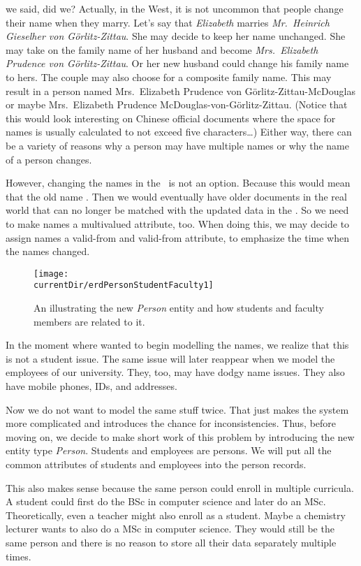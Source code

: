  we said, did we?
Actually, in the West, it is not uncommon that people change their name when they marry.
Let's say that \emph{Elizabeth} marries \emph{Mr.~Heinrich Gieselher von G{\"o}rlitz-Zittau}.
She may decide to keep her name unchanged.
She may take on the family name of her husband and become \emph{Mrs.~Elizabeth Prudence von G{\"o}rlitz-Zittau}.
Or her new husband could change his family name to hers.
The couple may also choose for a composite family name.
This may result in a person named Mrs.~Elizabeth Prudence von G{\"o}rlitz-Zittau-McDouglas or maybe Mrs.~Elizabeth Prudence McDouglas-von-G{\"o}rlitz-Zittau.
(Notice that this would look interesting on Chinese official documents where the space for names is usually calculated to not exceed five characters\dots)
Either way, there can be a variety of reasons why a person may have multiple names or why the name of a person changes.

However, changing the names in the \db\ is not an option.
Because this would mean that the old name .
Then we would eventually have older documents in the real world that can no longer be matched with the updated data in the \db.
So we need to make names a multivalued attribute, too.
When doing this, we may decide to assign names a valid-from and valid-from attribute, to emphasize the time when the names changed.

\begin{figure}%
\centering%
\texttt{[image: \\currentDir/erdPersonStudentFaculty1]}%
\caption{An  illustrating the new \emph{Person} entity and how students and faculty members are related to it.}%
\label{fig:erdPersonStudentFaculty1}%
\end{figure}%

In the moment where wanted to begin modelling the names, we realize that this is not a student issue.
The same issue will later reappear when we model the employees of our university.
They, too, may have dodgy name issues.
They also have mobile phones, IDs, and addresses.

Now we do not want to model the same stuff twice.
That just makes the system more complicated and introduces the chance for inconsistencies.
Thus, before moving on, we decide to make short work of this problem by introducing the new entity type \emph{Person}.
Students and employees are persons.
We will put all the common attributes of students and employees into the person records.

This also makes sense because the same person could enroll in multiple curricula.
A student could first do the BSc in computer science and later do an MSc.
Theoretically, even a teacher might also enroll as a student.
Maybe a chemistry lecturer wants to also do a MSc in computer science.
They would still be the same person and there is no reason to store all their data separately multiple times.

